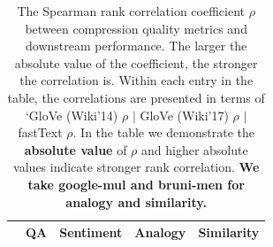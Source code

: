 \begin{table}
	\caption{The Spearman rank correlation coefficient $\rho$ between compression quality metrics and downstream performance. The larger the absolute value of the coefficient, the stronger the correlation is.
	Within each entry in the table, the correlations are presented in terms of `GloVe (Wiki'14) $\rho$ \; $|$ \; GloVe (Wiki'17) $\rho$ \; $|$ \; fastText $\rho$. In the table we demonstrate the \textbf{absolute value} of $\rho$ and higher absolute values indicate stronger rank correlation. \textbf{We take google-mul and bruni-men for analogy and similarity.}
	}
	\small
	\centering
	\begin{tabular}{c | c | c | c | c | c | c | c | c | c | c | c | c}
		\toprule
		& \multicolumn{3}{|c|}{QA} & \multicolumn{3}{|c|}{Sentiment} & \multicolumn{3}{|c|}{Analogy} & \multicolumn{3}{|c}{Similarity} \\
		\midrule

\end{tabular}
\end{table}

